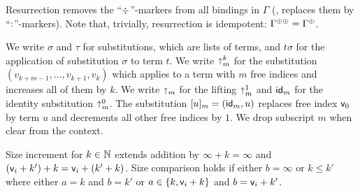 \documentclass[acmlarge,review,anonymous]{acmart}\settopmatter{printfolios=true}
\begin{document}
Resurrection\cite{pfenning:lics01} \fbox{$\resurrect\Gamma$} removes
the ``$\mathord{\div}$''-markers from all bindings in $\Gamma$ (\ie, replaces
them by ``$\mathord{:}$''-markers).  Note that, trivially, resurrection is idempotent: $\resurrecttwice\Gamma = \resurrect{\Gamma}$.

We write $\sigma$ and $\tau$ for substitutions, which are lists of terms, and $t \sigma$ for the application of substitution $\sigma$ to term $t$.  We write $\mathord{\shortuparrow}^k_m$ for the substitution $(v_{k+m-1},\dots,v_{k+1},v_k)$ which applies to a term with $m$ free indices and increases all of them by $k$.  We write $\mathord{\shortuparrow}_m$ for the lifting $\mathord{\shortuparrow}^1_m$ and $\mathsf{id}_m$ for the identity substitution $ \mathord{\shortuparrow}^0_m$. The substitution $[u]_m = (\mathsf{id}_m, u)$ replaces free index $\mathsf{v}_{0}$ by term $u$ and decrements all other free indices by $1$. We drop subscript $m$ when clear from the context.

Size increment  for $k \in \mathbb{N}$ extends addition by $\infty + k = \infty$ and $(\mathsf{v}_{i} + k') + k = \mathsf{v}_{i} + (k' + k)$.  Size comparison  holds if either $b = \infty$ or  $k \leq k'$ where either $a = k$ and $b = k'$ or $a \in \{ k, \mathsf{v}_{i} + k \}$ and $b = \mathsf{v}_{i} + k'$.
\end{document}
